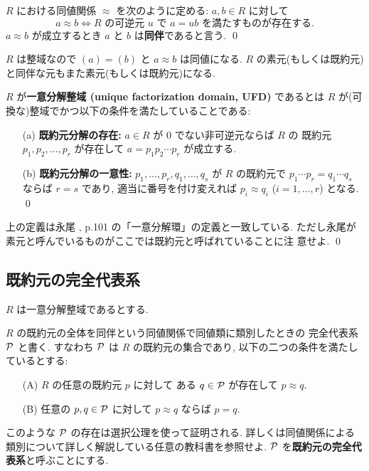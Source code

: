 \documentclass[12pt,twoside]{jarticle}
\begin{document}
\begin{definition}[同伴]
 $R$ における同値関係 $\approx$ を次のように定める:
 $a,b\in R$ に対して
 \begin{equation*}
  a\approx b \iff 
  \text{$R$ の可逆元 $u$ で $a=ub$ を満たすものが存在する.}
 \end{equation*}
 $a\approx b$ が成立するとき $a$ と $b$ は{\bf 同伴}であると言う.
 \qed
\end{definition}

$R$ は整域なので $(a)=(b)$ と $a\approx b$ は同値になる.
$R$ の素元(もしくは既約元)と同伴な元もまた素元(もしくは既約元)になる.

\begin{definition}
 $R$ が{\bf 一意分解整域 (unique factorization domain, UFD)} であるとは %
 $R$ が(可換な)整域でかつ以下の条件を満たしていることである:
 \begin{enumerate}
 \item[(a)] {\bf 既約元分解の存在:} 
  $a\in R$ が $0$ でない非可逆元ならば $R$ の
  既約元 $p_1,p_2,\ldots,p_r$ が存在して $a=p_1p_2\cdots p_r$ 
  が成立する.
 \item[(b)] {\bf 既約元分解の一意性:}
  $p_1,\ldots,p_r,q_1,\ldots,q_s$ が $R$ の既約元で %
  $p_1\cdots p_r=q_1\cdots q_s$ ならば $r=s$ であり, 
  適当に番号を付け変えれば $p_i\approx q_i$ ($i=1,\ldots,r$) となる.
 \qed
 \end{enumerate}
\end{definition}

\begin{rem}
 上の定義は永尾 \cite{nagao}, p.101 の「一意分解環」の定義と一致している.
 ただし永尾が素元と呼んでいるものがここでは既約元と呼ばれていることに注
 意せよ.
 \qed
\end{rem}


\subsection{既約元の完全代表系}

$R$ は一意分解整域であるとする.

$R$ の既約元の全体を同伴という同値関係で同値類に類別したときの
完全代表系 ${\mathcal P}$ と書く.
すなわち ${\mathcal P}$ は $R$ の既約元の集合であり, 
以下の二つの条件を満たしているとする:
\begin{enumerate}
 \item[(A)] $R$ の任意の既約元 $p$ に対して
   ある $q\in{\mathcal P}$ が存在して $p\approx q$.
 \item[(B)] 任意の $p,q\in{\mathcal P}$ に対して $p\approx q$ ならば $p=q$.
\end{enumerate}
このような ${\mathcal P}$ の存在は選択公理を使って証明される.
詳しくは同値関係による類別について詳しく解説している任意の教科書を参照せよ.
${\mathcal P}$ を{\bf 既約元の完全代表系}と呼ぶことにする.
\end{document}

